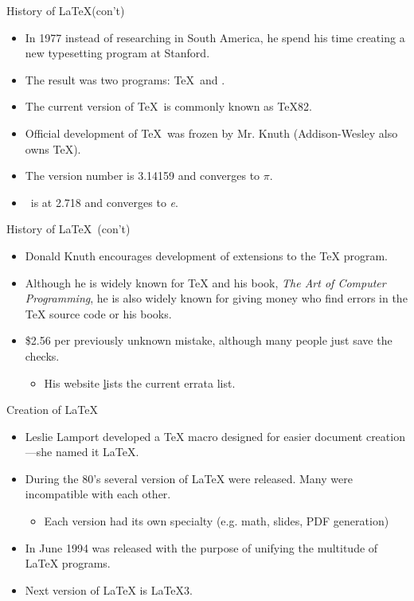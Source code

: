 \documentclass[pdf]{prosper}
\begin{document}
\begin{slide}{History of \LaTeX(con't)}
	\begin{itemize}
		\item In 1977 instead of researching in South America, he spend his time creating a new typesetting program at Stanford.
		\item The result was two programs: \TeX\ and \MF.
		\item The current version of \TeX\ is commonly known as \TeX 82.
		\item Official development of \TeX\ was frozen by Mr. Knuth (Addison-Wesley also owns \TeX).
		\item The version number is 3.14159 and converges to $\pi$.
		\item \MF\ is at 2.718 and converges to \textit{e}.
	\end{itemize}
\end{slide}
\begin{slide}{History of \LaTeX\ (con't)}
	\begin{itemize}
		\item Donald Knuth encourages development of extensions to the \TeX\mbox{} program.
		\item Although he is widely known for \TeX\mbox{} and his book, \textit{The Art of Computer Programming}, he is also widely known for giving money who find errors in the \TeX\mbox{} source code or his books.
		\item \$2.56 per previously unknown mistake, although many people just save the checks.
			\begin{itemize}
				\item His website \href{http://www-cs-faculty.stanford.edu/\~knuth} lists the current errata list.
			\end{itemize}
	\end{itemize}
\end{slide}
\begin{slide}{Creation of \LaTeX}
	\begin{itemize}
		\item Leslie Lamport developed a \TeX\mbox{} macro designed for easier document creation---she named it \LaTeX.
		\item During the 80's several version of \LaTeX\mbox{} were released. Many were incompatible with each other.
			\begin{itemize}
				\item Each version had its own specialty (e.g. math, slides, PDF generation)
			\end{itemize}
		\item In June 1994 \LaTeXe\mbox{} was released with the purpose of unifying the multitude of \LaTeX\mbox{} programs.
		\item Next version of \LaTeX\mbox{} is \LaTeX3.
	\end{itemize}
\end{slide}
\end{document}
